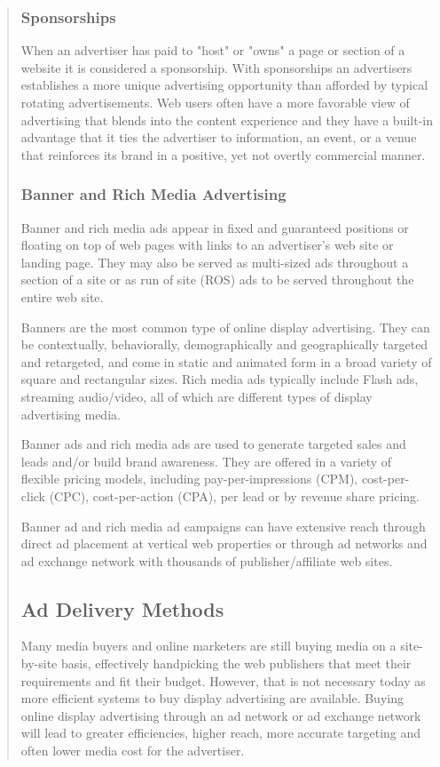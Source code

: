 \documentclass[35pt]{report}
\begin{document}
\begin{quote}
			\subsubsection{Sponsorships}
When an advertiser has paid to "host" or "owns" a page or section of a website it is considered a sponsorship. With sponsorships an advertisers establishes a more unique advertising opportunity than afforded by typical rotating advertisements. Web users often have a more favorable view of advertising that blends into the content experience and they have a built-in advantage that it ties the advertiser to information, an event, or a venue that reinforces its brand in a positive, yet not overtly commercial manner.

			\subsubsection{Banner and Rich Media Advertising}
Banner and rich media ads appear in fixed and guaranteed positions or floating on top of web pages with links to an advertiser's web site or landing page. They may also be served as multi-sized ads throughout a section of a site or as run of site (ROS) ads to be served throughout the entire web site.

Banners are the most common type of online display advertising. They can be contextually, behaviorally, demographically and geographically targeted and retargeted, and come in static and animated form in a broad variety of square and rectangular sizes. Rich media ads typically include Flash ads, streaming audio/video, all of which are different types of display advertising media.

Banner ads and rich media ads are used to generate targeted sales and leads and/or build brand awareness. They are offered in a variety of flexible pricing models, including pay-per-impressions (CPM), cost-per-click (CPC), cost-per-action (CPA), per lead or by revenue share pricing.

Banner ad and rich media ad campaigns can have extensive reach through direct ad placement at vertical web properties or through ad networks and ad exchange network with thousands of publisher/affiliate web sites.
		\subsection{Ad Delivery Methods}
Many media buyers and online marketers are still buying media on a site-by-site basis, effectively handpicking the web publishers that meet their requirements and fit their budget. However, that is not necessary today as more efficient systems to buy display advertising are available. Buying online display advertising through an ad network or ad exchange network will lead to greater efficiencies, higher reach, more accurate targeting and often lower media cost for the advertiser.


\end{quote}
\end{document}
